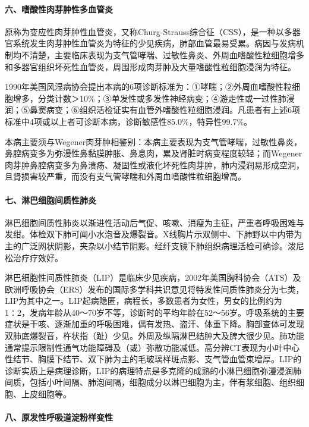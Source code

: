 \paragraph{六、嗜酸性肉芽肿性多血管炎}

原称为变应性肉芽肿性血管炎，又称Churg-Strauss综合征（CSS），是一种以多器官系统发生肉芽肿性血管炎为特征的少见疾病，肺部血管最易受累。病因与发病机制均不清楚，主要临床表现为支气管哮喘、过敏性鼻炎、外周血嗜酸性粒细胞增多和多器官组织坏死性血管炎，周围形成肉芽肿及大量嗜酸性粒细胞浸润为特征。

1990年美国风湿病协会提出本病的6项诊断标准为：①哮喘；②外周血嗜酸性粒细胞增多，分类计数＞10\%；③单发性或多发性神经病变；④游走性或一过性肺浸润；⑤鼻窦病变；⑥组织活检证实有血管外嗜酸性粒细胞浸润。凡患者有上述6项标准中4项或以上者可诊断本病，诊断敏感性85.0\%，特异性99.7\%。

本病主要须与Wegener肉芽肿相鉴别：本病主要表现为支气管哮喘，过敏性鼻炎，鼻腔病变多为弥漫性鼻黏膜肿胀、鼻息肉，累及肾脏时病变程度较轻；而Wegener肉芽肿鼻腔病变多为鼻溃疡、凝固性或液化坏死性肉芽肿，肺内浸润易形成空洞，且肾损害较严重，而没有支气管哮喘和外周血嗜酸性粒细胞增高。

\paragraph{七、淋巴细胞间质性肺炎}

淋巴细胞间质性肺炎以渐进性活动后气促、咳嗽、消瘦为主征，严重者呼吸困难与发绀。体检双下肺可闻小水泡音及爆裂音。X线胸片示双侧中、下肺野以中内带为主的广泛网状阴影，夹杂以小结节阴影。经纤支镜下肺组织病理活检可确诊。泼尼松治疗疗效好。

淋巴细胞性间质性肺炎（LIP）是临床少见疾病，2002年美国胸科协会（ATS）及欧洲呼吸协会（ERS）发布的国际多学科共识意见将特发性间质性肺炎分为七类，LIP为其中之一。LIP起病隐匿，病程长，多数患者为女性，男女的比例约为1∶2，发病年龄从40～70岁不等，诊断时的平均年龄在52～56岁。呼吸系统的主要症状是干咳、逐渐加重的呼吸困难，偶有发热、盗汗、体重下降。胸部查体可发现双肺底爆裂音，杵状指（趾）少见。外周及纵隔淋巴结肿大及脾大很少见。肺功能通常提示限制性通气功能障碍及（或）弥散功能减低。高分辨CT表现为小叶中心性结节、胸膜下结节、双下肺为主的毛玻璃样斑点影、支气管血管束增厚。LIP的诊断实质上是病理诊断，LIP的病理特点是多克隆的成熟的小淋巴细胞弥漫浸润肺间质，包括小叶间隔、肺泡间隔，细胞成分以淋巴细胞为主，伴有浆细胞、组织细胞、上皮细胞等。

\paragraph{八、原发性呼吸道淀粉样变性}

